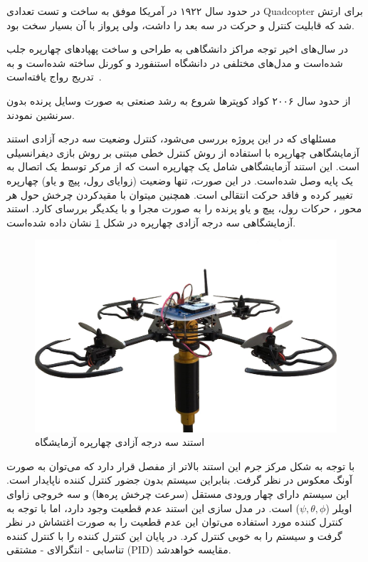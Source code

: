 در حدود سال ۱۹۲۲ در آمریکا  موفق به ساخت و تست تعدادی Quadcopter برای ارتش شد که قابلیت کنترل و حرکت در سه بعد را داشت، ولی پرواز با آن بسیار سخت بود.

در سال‌های اخیر توجه مراکز دانشگاهی به طراحی و ساخت پهپادهای چهارپره جلب شده‌است و مدل‌های مختلفی در دانشگاه استنفورد و کورنل ساخته شده‌است و به تدریج رواج یافته‌است~\cite{5717652}.

از حدود سال ۲۰۰۶ کواد کوپترها شروع به رشد صنعتی به صورت وسایل پرنده بدون سرنشین نمودند.


مسئلهای که در این پروژه بررسی می‌شود، کنترل وضعیت سه درجه آزادی استند آزمایشگاهی چهارپره با استفاده از روش کنترل خطی مبتنی بر روش بازی دیفرانسیلی است. این استند آزمایشگاهی شامل یک چهارپره است که از 
مرکر توسط یک اتصال به یک پایه وصل شده‌است. در این صورت، تنها وضعیت (زوایای رول، پیچ و یاو) 
چهارپره تغییر کرده و فاقد حرکت انتقالی است. همچنین میتوان با مقیدکردن چرخش حول هر محور ، 
حرکات رول، پیچ و یاو پرنده را به صورت مجرا و با یکدیگر بررسای کارد.
استند آزمایشگاهی سه درجه آزادی چهارپره در شکل \ref{LabQuad} نشان داده شده‌است.

\begin{figure}[H]\label{LabQuad}
	\includegraphics[width=12cm]{figs/introduction/3DOFQuad.jpg}
	\centering
	\caption{استند سه درجه آزادی چهارپره آزمایشگاه\cite{Iranlabexpo}}
\end{figure}
با توجه به شکل مرکز جرم این استند بالاتر از مفصل قرار دارد که می‌توان به صورت آونگ معکوس در نظر گرفت. بنابراین سیستم بدون جضور کنترل کننده ناپایدار است. این سیستم دارای چهار ورودی مستقل (سرعت چرخش پره‌ها) و سه خروجی زاوای اویلر ($\psi, \theta, \phi$) است. در مدل سازی این استند عدم قطعیت وجود دارد، اما با توجه به کنترل کننده مورد استفاده می‌توان این عدم قطعیت را به صورت اغتشاش در نظر گرفت و سیستم را به خوبی کنترل کرد. در پایان این کنترل کننده را با کنترل کننده تناسابی - انتگرالای -
مشتقی (PID) مقایسه خواهد‌شد.




